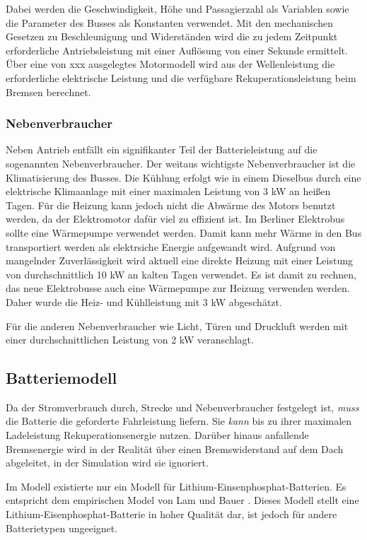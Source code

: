 Dabei werden die Geschwindigkeit, Höhe und Passagierzahl als Variablen sowie die Parameter des Busses als Konstanten verwendet. Mit den mechanischen Gesetzen zu Beschleunigung und Widerständen wird die zu jedem Zeitpunkt erforderliche Antriebsleistung mit einer Auflösung von einer Sekunde ermittelt. Über eine von xxx  ausgelegtes Motormodell wird aus der Wellenleistung die erforderliche elektrische Leistung und die verfügbare Rekuperationsleistung beim Bremsen berechnet.

\subsubsection{Nebenverbraucher}
Neben Antrieb entfällt ein signifikanter Teil der Batterieleistung auf die sogenannten Nebenverbraucher. Der weitaus wichtigste Nebenverbraucher ist die Klimatisierung des Busses. Die Kühlung erfolgt wie in einem Dieselbus durch eine elektrische Klimaanlage mit einer maximalen Leistung von 3 kW an heißen Tagen. Für die Heizung kann jedoch nicht die Abwärme des Motors benutzt werden, da der Elektromotor dafür viel zu effizient ist. Im Berliner Elektrobus sollte eine Wärmepumpe verwendet werden. Damit kann mehr Wärme in den Bus transportiert werden als elektrsiche Energie aufgewandt wird. Aufgrund von mangelnder Zuverlässigkeit wird aktuell eine direkte Heizung mit einer Leistung von durchschnittlich 10 kW an kalten Tagen verwendet. Es ist damit zu rechnen, das neue Elektrobusse auch eine Wärmepumpe zur Heizung verwenden werden. Daher wurde die Heiz- und Kühlleistung mit 3 kW abgeschätzt.

Für die anderen Nebenverbraucher wie Licht, Türen und Druckluft werden mit einer durchschnittlichen Leistung von 2 kW veranschlagt.

\subsection{Batteriemodell}
Da der Stromverbrauch durch, Strecke und Nebenverbraucher festgelegt ist, \emph{muss} die Batterie die geforderte Fahrleistung liefern. Sie \emph{kann} bis zu ihrer maximalen Ladeleistung Rekuperationsenergie nutzen. Darüber hinaus anfallende Bremsenergie wird in der Realität über einen Bremswiderstand auf dem Dach abgeleitet, in der Simulation wird sie ignoriert.

Im Modell existierte nur ein Modell für Lithium-Einsenphosphat-Batterien. Es entspricht dem empirischen Model von Lam und Bauer \cite{lam2011practical}. Dieses Modell stellt eine Lithium-Eisenphosphat-Batterie in hoher Qualität dar, ist jedoch für andere Batterietypen ungeeignet.

